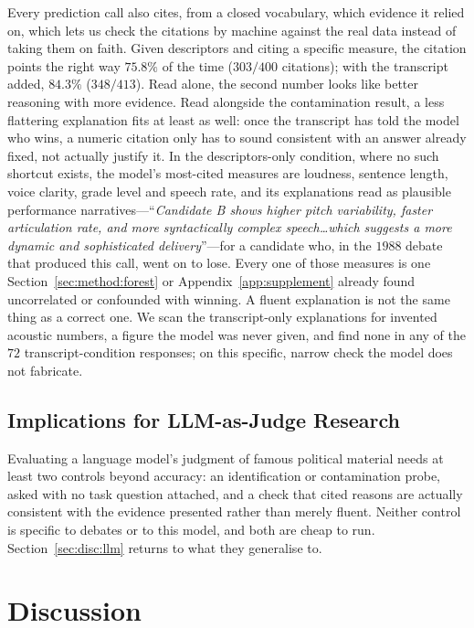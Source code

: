\documentclass[journal]{IEEEtran}
\begin{document}
Every prediction call also cites, from a closed vocabulary, which evidence
it relied on, which lets us check the citations by machine against the real
data instead of taking them on faith. Given descriptors and citing a
specific measure, the citation points the right way $75.8\%$ of the time
($303/400$ citations); with the transcript added, $84.3\%$ ($348/413$). Read
alone, the second number looks like better reasoning with more evidence.
Read alongside the contamination result, a less flattering explanation fits
at least as well: once the transcript has told the model who wins, a
numeric citation only has to sound consistent with an answer already fixed,
not actually justify it. In the descriptors-only condition, where no such
shortcut exists, the model's most-cited measures are loudness, sentence
length, voice clarity, grade level and speech rate, and its explanations
read as plausible performance narratives---``\emph{Candidate B shows higher
pitch variability, faster articulation rate, and more syntactically complex
speech\ldots which suggests a more dynamic and sophisticated delivery}''---for
a candidate who, in the $1988$ debate that produced this call, went on to
lose. Every one of those measures is one Section~\ref{sec:method:forest} or
Appendix~\ref{app:supplement} already found uncorrelated or confounded with
winning. A fluent explanation is not the same thing as a correct one. We
scan the transcript-only explanations for invented acoustic numbers, a
figure the model was never given, and find none in any of the $72$
transcript-condition responses; on this specific, narrow check the model
does not fabricate.

\subsection{Implications for LLM-as-Judge Research}
\label{sec:llm:implications}

Evaluating a language model's judgment of famous political material needs
at least two controls beyond accuracy: an identification or contamination
probe, asked with no task question attached, and a check that cited reasons
are actually consistent with the evidence presented rather than merely
fluent. Neither control is specific to debates or to this model, and both
are cheap to run. Section~\ref{sec:disc:llm} returns to what they generalise
to.

\section{Discussion}
\label{sec:disc}
\end{document}
